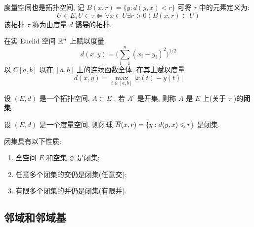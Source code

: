  度量空间也是拓扑空间, 记 $ B(x, r)=\{ y: d(y, x)<r \} $ 可将 $ \tau $ 中的元素定义为: 
 \[
      U\in E, U\in \tau\Leftrightarrow \forall x\in U\exists r>0(B(x, r)\subset U)
 \] 
 该拓扑 $ \tau $ 称为由度量 $ d $ \textbf{诱导}的拓扑. 

 \begin{Ex} 
      在实 Euclid 空间 $ \R^{n} $ 上赋以度量
      \begin{equation}
           d(x, y)=\bigg( \sum_{i=1}^{n}(x_{i}-y_{i})^{2} \bigg)^{1/2}\tag{Euclid距离}
      \end{equation}
     以 $ C[a, b] $ 以在 $ [a, b] $ 上的连续函数全体, 在其上赋以度量
     \begin{equation}
          d(x, y) = \max_{t\in [a, b]} |x(t)-y(t)|\tag{一致距离}
     \end{equation}
 \end{Ex}
 \begin{Def}[闭集]\label{def:闭集}
      设 $ (E, d) $ 是一个拓扑空间, $ A\subset E $ , 若 $ A^{c} $ 是开集, 则称 $ A $ 是 $ E $ 上(关于 $ \tau $ )的\textbf{闭集}.
 \end{Def}
 \begin{Ex}
      设 $ (E, d) $ 是一个度量空间, 则闭球 $ \baro{B}(x, r)=\{ y: d(y, x)\leqslant r \} $ 是闭集. 
 \end{Ex} 
 \begin{Prop}\label{prop:闭集的性质}
      闭集具有以下性质:
      \begin{enumerate}[(1)]
           \item 全空间 $ E $ 和空集 $ \varnothing $ 是闭集;
           \item 任意多个闭集的交仍是闭集(任意交);
           \item 有限多个闭集的并仍是闭集(有限并).
      \end{enumerate}
 \end{Prop}

 \subsection{邻域和邻域基}

